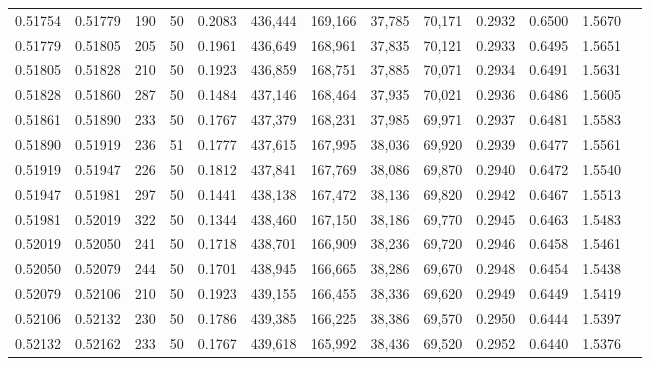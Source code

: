 \begin{tabular}{rrrrrrrrrrrrr}
0.51754 & 0.51779 &   190 &  50 &                                     0.2083 & 436,444 & 169,166 &  37,785 &  70,171 & 0.2932 & 0.6500 & 1.5670 \\
0.51779 & 0.51805 &   205 &  50 &                                     0.1961 & 436,649 & 168,961 &  37,835 &  70,121 & 0.2933 & 0.6495 & 1.5651 \\
0.51805 & 0.51828 &   210 &  50 &                                     0.1923 & 436,859 & 168,751 &  37,885 &  70,071 & 0.2934 & 0.6491 & 1.5631 \\
0.51828 & 0.51860 &   287 &  50 &                                     0.1484 & 437,146 & 168,464 &  37,935 &  70,021 & 0.2936 & 0.6486 & 1.5605 \\
0.51861 & 0.51890 &   233 &  50 &                                     0.1767 & 437,379 & 168,231 &  37,985 &  69,971 & 0.2937 & 0.6481 & 1.5583 \\
0.51890 & 0.51919 &   236 &  51 &                                     0.1777 & 437,615 & 167,995 &  38,036 &  69,920 & 0.2939 & 0.6477 & 1.5561 \\
0.51919 & 0.51947 &   226 &  50 &                                     0.1812 & 437,841 & 167,769 &  38,086 &  69,870 & 0.2940 & 0.6472 & 1.5540 \\
0.51947 & 0.51981 &   297 &  50 &                                     0.1441 & 438,138 & 167,472 &  38,136 &  69,820 & 0.2942 & 0.6467 & 1.5513 \\
0.51981 & 0.52019 &   322 &  50 &                                     0.1344 & 438,460 & 167,150 &  38,186 &  69,770 & 0.2945 & 0.6463 & 1.5483 \\
0.52019 & 0.52050 &   241 &  50 &                                     0.1718 & 438,701 & 166,909 &  38,236 &  69,720 & 0.2946 & 0.6458 & 1.5461 \\
0.52050 & 0.52079 &   244 &  50 &                                     0.1701 & 438,945 & 166,665 &  38,286 &  69,670 & 0.2948 & 0.6454 & 1.5438 \\
0.52079 & 0.52106 &   210 &  50 &                                     0.1923 & 439,155 & 166,455 &  38,336 &  69,620 & 0.2949 & 0.6449 & 1.5419 \\
0.52106 & 0.52132 &   230 &  50 &                                     0.1786 & 439,385 & 166,225 &  38,386 &  69,570 & 0.2950 & 0.6444 & 1.5397 \\
0.52132 & 0.52162 &   233 &  50 &                                     0.1767 & 439,618 & 165,992 &  38,436 &  69,520 & 0.2952 & 0.6440 & 1.5376 \\

\end{tabular}
